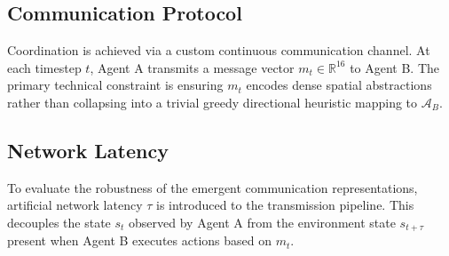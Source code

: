 \documentclass{article}
\begin{document}
\subsection{Communication Protocol}
Coordination is achieved via a custom continuous communication channel. At each timestep $t$, Agent A transmits a message vector $m_t \in \mathbb{R}^{16}$ to Agent B. The primary technical constraint is ensuring $m_t$ encodes dense spatial abstractions rather than collapsing into a trivial greedy directional heuristic mapping to $\mathcal{A}_B$.

\subsection{Network Latency}
To evaluate the robustness of the emergent communication representations, artificial network latency $\tau$ is introduced to the transmission pipeline. This decouples the state $s_t$ observed by Agent A from the environment state $s_{t+\tau}$ present when Agent B executes actions based on $m_t$.
\end{document}
